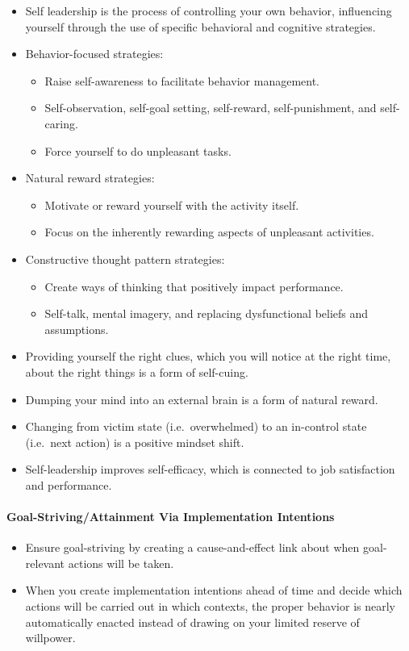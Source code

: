 \documentclass{article}
\begin{document}
\begin{itemize}
 \item Self leadership is the process of controlling your own behavior, influencing yourself through the use of specific behavioral and cognitive strategies.
 \item Behavior-focused strategies:
 \begin{itemize}
  \item Raise self-awareness to facilitate behavior management.
  \item Self-observation, self-goal setting, self-reward, self-punishment, and self-caring.
  \item Force yourself to do unpleasant tasks.
 \end{itemize}
 \item Natural reward strategies:
 \begin{itemize}
  \item Motivate or reward yourself with the activity itself.
  \item Focus on the inherently rewarding aspects of unpleasant activities.
 \end{itemize}
 \item Constructive thought pattern strategies:
 \begin{itemize}
  \item Create ways of thinking that positively impact performance.
  \item Self-talk, mental imagery, and replacing dysfunctional beliefs and assumptions.
 \end{itemize}
 \item Providing yourself the right clues, which you will notice at the right time, about the right things is a form of self-cuing.
 \item Dumping your mind into an external brain is a form of natural reward.
 \item Changing from victim state (i.e.\ overwhelmed) to an in-control state (i.e.\ next action) is a positive mindset shift.
 \item Self-leadership improves self-efficacy, which is connected to job satisfaction and performance.
\end{itemize}

\paragraph{Goal-Striving/Attainment Via Implementation Intentions}

\begin{itemize}
 \item Ensure goal-striving by creating a cause-and-effect link about when goal-relevant actions will be taken.
 \item When you create implementation intentions ahead of time and decide which actions will be carried out in which contexts, the proper behavior is nearly automatically enacted instead of drawing on your limited reserve of willpower.
\end{itemize}
\end{document}
